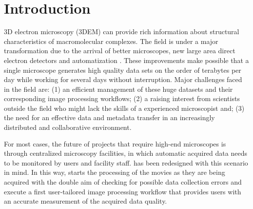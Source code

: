
\section{Introduction}

3D electron microscopy (3DEM)  can provide rich information about structural characteristics of macromolecular complexes. The field is under a major transformation due to the arrival of better microscopes, new large area direct electron detectors and automatization \citep{kuhlbrandt2014a, Kuhlbrandt2014b}. These improvements make possible that a single microscope generates high quality data sets on the order of terabytes per day \citep{Saibil2015} while working for several days without interruption. Major challenges faced in the field are: (1) an efficient management of these huge datasets and their corresponding image processing workflows; (2) a raising interest from scientists outside the field who might lack the skills of a experienced microscopist and; (3) the need for an effective data and metadata transfer in an increasingly distributed and collaborative environment. %



For most cases, the future of projects that require high-end microscopes is through centralized microscopy facilities, in which automatic acquired data needs to be monitored by users and facility staff.  \scipion has been redesigned with this scenario in mind. %
In this way, \scipion starts the processing of the movies as they are being acquired with the double aim of checking for possible data collection errors and execute a first user-tailored image processing workflow that provides users with an accurate measurement of the acquired data quality.

